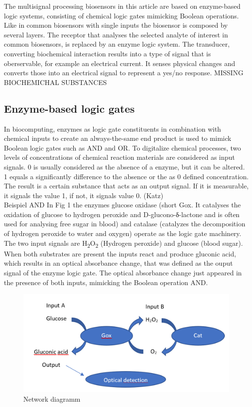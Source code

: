 \documentclass[runningheads]{llncs}
\begin{document}
The multisignal processing biosensors in this article are based on enzyme-based logic systems, consisting of chemical logic gates mimicking Boolean operations. Like in common biosensors with single inputs the biosensor is composed by several layers. The receptor that analyses the selected analyte of interest in common biosensors, is replaced by an enzyme logic system.
The transducer, converting biochemical interaction results into a type of signal that is oberservable, for example an electrical current. It senses physical changes and converts those into an electrical signal to represent a yes/no response.
MISSING BIOCHEMICHAL SUBSTANCES

\subsection{Enzyme-based logic gates}		
		In biocomputing, enzymes as logic gate constituents in combination with chemical inputs to create an always-the-same end product is used to mimick Boolean logic gates such as AND and OR. To digitalize chemical processes, two levels of concentrations of chemical reaction materials are considered as input signals. 0 is usually considered as the absence of a enzyme, but it can be altered. 1 equals a  significantly difference to the absence or the as 0 defined concentration.
		The result is a certain substance that acts as an output signal. If it is measurable, it signals the value 1, if not, it signals value 0.
	(Katz) \\
	
		Beispiel AND 
		In Fig 1 the enzymes glucose oxidase (short Gox. It catalyses the oxidation of glucose to hydrogen peroxide and D-glucono-δ-lactone and is often used for analysing free sugar in blood) and catalase (catalyzes the decomposition of hydrogen peroxide to water and oxygen) operate as the logic gate machinery. The two input signals are H\textsubscript{2}O\textsubscript{2} (Hydrogen peroxide) and glucose (blood sugar). When both substrates are present the inputs react and produce gluconic acid, which results in an optical absorbance change, that was defined as the ouput signal of the enzyme logic gate. The optical absorbance change just appeared in the presence of both inputs, mimicking the Boolean operation AND. 
		
		\begin{figure}[H] \centering \includegraphics[scale= 0.3]{pics/ANDneu.png} \caption{Network diagramm} \label{img:and} \end{figure}
		
\end{document}
